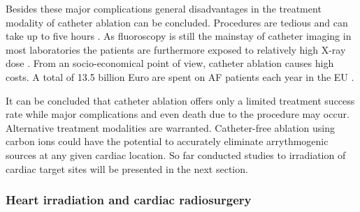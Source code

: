 Besides these major complications general disadvantages in the treatment modality of catheter ablation can be concluded. 
Procedures are tedious and can take up to five hours \cite{Jong05}. As fluoroscopy is still the mainstay of catheter imaging in most 
laboratories the patients are furthermore exposed to relatively high X-ray dose \cite{Ber10}. From an socio-economical point of view, 
catheter ablation causes high costs. A total of 13.5 billion Euro are spent on AF patients each year in the EU \cite{Fus06}.\newline

It can be concluded that catheter ablation offers only a limited treatment success rate while major complications and even death due to the 
procedure may occur. Alternative treatment modalities are warranted. Catheter-free ablation using carbon ions could have the potential to 
accurately eliminate arrythmogenic sources at any given cardiac location. So far conducted studies to irradiation of cardiac target sites will 
be presented in the next section. 


\subsubsection*{Heart irradiation and cardiac radiosurgery}
\label{cardiacradiosurgery}


